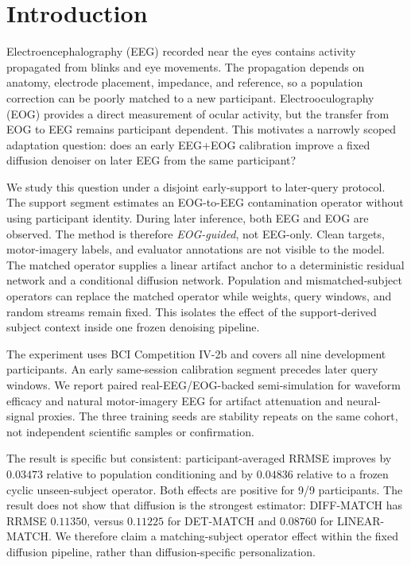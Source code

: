 \section{Introduction}
\label{sec:introduction}

Electroencephalography (EEG) recorded near the eyes contains activity propagated
from blinks and eye movements. The propagation depends on anatomy, electrode
placement, impedance, and reference, so a population correction can be poorly
matched to a new participant. Electrooculography (EOG) provides a direct
measurement of ocular activity, but the transfer from EOG to EEG remains
participant dependent. This motivates a narrowly scoped adaptation question:
does an early EEG+EOG calibration improve a fixed diffusion denoiser on later
EEG from the same participant?

We study this question under a disjoint early-support to later-query protocol.
The support segment estimates an EOG-to-EEG contamination operator without
using participant identity. During later inference, both EEG and EOG are
observed. The method is therefore \emph{EOG-guided}, not EEG-only. Clean targets,
motor-imagery labels, and evaluator annotations are not visible to the model.
The matched operator supplies a linear artifact anchor to a deterministic
residual network and a conditional diffusion network. Population and
mismatched-subject operators can replace the matched operator while weights,
query windows, and random streams remain fixed. This isolates the effect of the
support-derived subject context inside one frozen denoising pipeline.

The experiment uses BCI Competition IV-2b and covers all nine development
participants. An early same-session calibration segment precedes later query
windows. We report paired real-EEG/EOG-backed semi-simulation for waveform
efficacy and natural motor-imagery EEG for artifact attenuation and neural-signal
proxies. The three training seeds are stability repeats on the same cohort,
not independent scientific samples or confirmation.

The result is specific but consistent: participant-averaged RRMSE improves by
$0.03473$ relative to population conditioning and by $0.04836$ relative to a
frozen cyclic unseen-subject operator. Both effects are positive for 9/9
participants. The result does not show that diffusion is the strongest estimator:
DIFF-MATCH has RRMSE $0.11350$, versus $0.11225$ for DET-MATCH and $0.08760$
for LINEAR-MATCH. We therefore claim a matching-subject operator effect within
the fixed diffusion pipeline, rather than diffusion-specific personalization.

